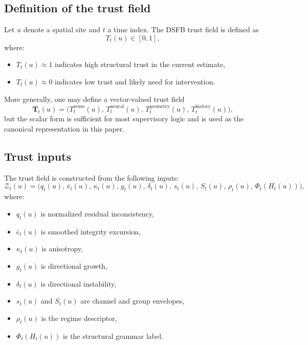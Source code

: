 \documentclass[11pt,letterpaper]{article}
\theoremstyle{gcresult}
\theoremstyle{definition}
\begin{document}

\subsection{Definition of the trust field}

Let $u$ denote a spatial site and $t$ a time index. The DSFB trust field is defined as
\begin{equation}
T_t(u)\in[0,1],
\end{equation}
where:
\begin{itemize}[leftmargin=1.5em]
    \item $T_t(u)\approx 1$ indicates high structural trust in the current estimate,
    \item $T_t(u)\approx 0$ indicates low trust and likely need for intervention.
\end{itemize}

More generally, one may define a vector-valued trust field
\begin{equation}
\mathbf{T}_t(u)=\bigl(T^{\mathrm{reuse}}_t(u),\,T^{\mathrm{neural}}_t(u),\,T^{\mathrm{geometry}}_t(u),\,T^{\mathrm{history}}_t(u)\bigr),
\end{equation}
but the scalar form is sufficient for most supervisory logic and is used as the canonical representation in this paper.


\subsection{Trust inputs}

The trust field is constructed from the following inputs:
\begin{equation}
\mathcal{Z}_t(u)=
\bigl(
q_t(u),\,
\bar e_t(u),\,
\kappa_t(u),\,
g_t(u),\,
\delta_t(u),\,
s_t(u),\,
S_t(u),\,
\rho_t(u),\,
\Phi_t(H_t(u))
\bigr),
\end{equation}
where:
\begin{itemize}[leftmargin=1.5em]
    \item $q_t(u)$ is normalized residual inconsistency,
    \item $\bar e_t(u)$ is smoothed integrity excursion,
    \item $\kappa_t(u)$ is anisotropy,
    \item $g_t(u)$ is directional growth,
    \item $\delta_t(u)$ is directional instability,
    \item $s_t(u)$ and $S_t(u)$ are channel and group envelopes,
    \item $\rho_t(u)$ is the regime descriptor,
    \item $\Phi_t(H_t(u))$ is the structural grammar label.
\end{itemize}
\end{document}
